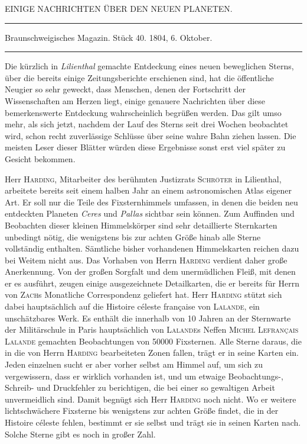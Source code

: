 \clearpage
{}
\hypertarget{native-258-lower}{}
\begin{center}
EINIGE NACHRICHTEN ÜBER DEN NEUEN PLANETEN.

\rule{0.75\linewidth}{0.4pt}

Braunschweigisches Magazin. Stück 40. 1804, 6. Oktober.

\rule{0.75\linewidth}{0.4pt}
\end{center}

Die kürzlich in \emph{Lilienthal} gemachte Entdeckung eines neuen beweglichen Sterns, über die bereits einige Zeitungsberichte erschienen sind, hat die öffentliche Neugier so sehr geweckt, dass Menschen, denen der Fortschritt der Wissenschaften am Herzen liegt, einige genauere Nachrichten über diese bemerkenswerte Entdeckung wahrscheinlich begrüßen werden. Das gilt umso mehr, als sich
jetzt, nachdem der Lauf des Sterns seit drei Wochen beobachtet wird, schon recht zuverlässige Schlüsse über seine wahre Bahn ziehen lassen. Die meisten Leser dieser Blätter würden diese Ergebnisse sonst erst viel später zu Gesicht bekommen.

Herr \textsc{Harding}, Mitarbeiter des berühmten Justizrats \textsc{Schröter} in Lilienthal, arbeitete bereits seit einem halben Jahr an einem astronomischen Atlas eigener Art. Er soll nur die Teile des Fixsternhimmels umfassen, in denen die beiden neu entdeckten Planeten \emph{Ceres} und \emph{Pallas} sichtbar sein können. Zum Auffinden und Beobachten dieser kleinen Himmelskörper sind sehr detaillierte Sternkarten unbedingt nötig, die wenigstens bis zur achten Größe hinab alle Sterne vollständig enthalten. Sämtliche bisher vorhandenen Himmelskarten reichen dazu bei Weitem nicht aus. Das Vorhaben von Herrn \textsc{Harding} verdient daher große Anerkennung. Von der großen Sorgfalt und dem unermüdlichen Fleiß, mit denen er es ausführt, zeugen einige ausgezeichnete Detailkarten, die er bereits für Herrn von \textsc{Zach}s Monatliche Correspondenz geliefert hat. Herr \textsc{Harding} stützt sich dabei hauptsächlich auf die Histoire céleste française von \textsc{Lalande}, ein unschätzbares Werk. Es enthält die innerhalb von 10 Jahren an der Sternwarte der Militärschule in Paris hauptsächlich von \textsc{Lalande}s Neffen \textsc{Michel Lefrançais Lalande} gemachten Beobachtungen von 50000 Fixsternen. Alle Sterne daraus, die in die von Herrn \textsc{Harding} bearbeiteten Zonen fallen, trägt er in seine Karten ein. Jeden einzelnen sucht er aber vorher selbst am Himmel auf, um sich zu vergewissern, dass er wirklich vorhanden ist, und um etwaige Beobachtungs-, Schreib- und Druckfehler zu berichtigen, die bei einer so gewaltigen Arbeit unvermeidlich sind. Damit begnügt sich Herr \textsc{Harding} noch nicht. Wo er weitere lichtschwächere Fixsterne bis wenigstens zur achten Größe findet, die in der Histoire céleste fehlen, bestimmt er sie selbst und trägt sie in seinen Karten nach. Solche Sterne gibt es noch in großer Zahl.


